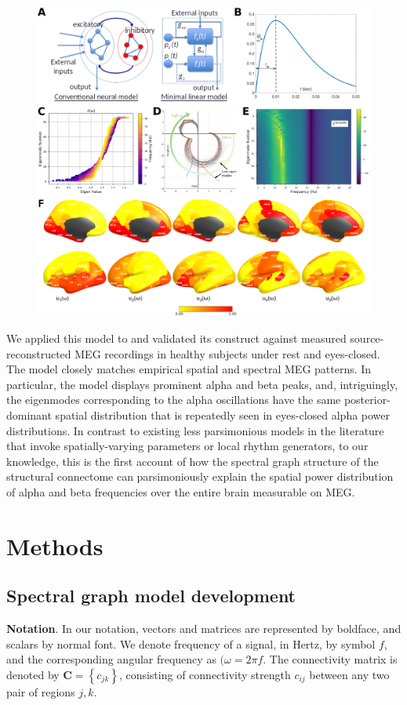 \begin{figure}[h!]
	\ContinuedFloat
    \centering
    \captionsetup{labelformat=adja-page}
    \includegraphics[width=\textwidth]{../figures/chapter5/figure1.png}
    \caption[]{}
\end{figure}

We applied this model to and validated its construct against measured
source-reconstructed MEG recordings in healthy subjects under rest and
eyes-closed. The model closely matches empirical spatial and spectral
MEG patterns. In particular, the model displays prominent alpha and beta
peaks, and, intriguingly, the eigenmodes corresponding to the alpha
oscillations have the same posterior-dominant spatial distribution that
is repeatedly seen in eyes-closed alpha power distributions. In contrast
to existing less parsimonious models in the literature that invoke
spatially-varying parameters or local rhythm generators, to our
knowledge, this is the first account of how the spectral graph structure
of the structural connectome can parsimoniously explain the spatial
power distribution of alpha and beta frequencies over the entire brain
measurable on MEG.

\section{Methods}

\subsection{Spectral graph model development}
\textbf{Notation}. In our notation, vectors and matrices are
represented by boldface, and scalars by normal font. We denote frequency
of a signal, in Hertz, by symbol $f$, and the corresponding angular
frequency as $(\omega = 2 \pi f$. The connectivity matrix is denoted by
$\mathbf{C} = \left\{ c_{jk} \right\}$, consisting of
connectivity strength $c_{ij}$ between any two pair of regions $j,k$.

